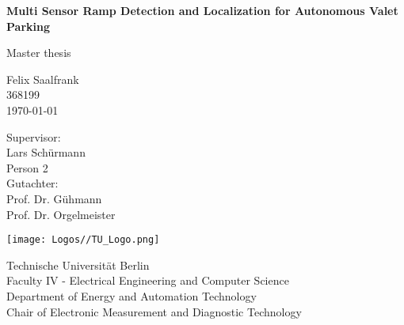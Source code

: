 \begin{titlepage}
	\begin{center} %
		\vspace*{1cm} %

		\Huge
		\textbf{Multi Sensor Ramp Detection and Localization for Autonomous Valet Parking}

		\vspace{0.5cm}
		Master thesis

		\vspace{1.5cm}
		\LARGE{Felix Saalfrank}\\
		\large 368199\\
		\vspace{1cm}
		\today

		\vspace{1.5cm}

		Supervisor:\\
		Lars Sch\"urmann\\
		Person 2\\
		Gutachter:\\
		Prof. Dr. G\"uhmann\\
		Prof. Dr. Orgelmeister

		\vfill

		\vspace{0.8cm}

		\texttt{[image: Logos//TU\_Logo.png]}

		Technische Universit\"at Berlin\\
		Faculty IV - Electrical Engineering and Computer Science\\
		Department of Energy and Automation Technology\\
		Chair of Electronic Measurement and Diagnostic Technology\\
	\end{center}
\end{titlepage}